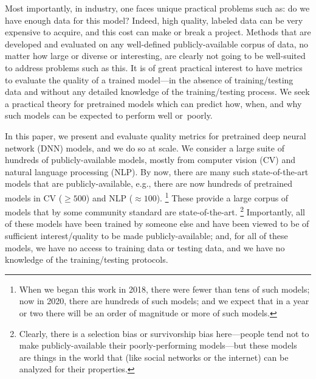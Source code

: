 Most importantly, in industry, one faces unique practical problems such as: do we have enough data for this model? 
Indeed, high quality, labeled data can be very expensive to acquire, and this cost can make or break a project.
Methods that are developed and evaluated on any well-defined publicly-available corpus of data, no matter how large or diverse or interesting, are clearly not going to be well-suited to address problems such as this.
It is of great practical interest to have metrics to evaluate the quality of a trained model---in the absence of training/testing data and without any detailed knowledge of the training/testing process.  
We seek a practical theory for pretrained models which can predict how, when, and why such models can be expected to perform well or~poorly.

In this paper, we present and evaluate quality metrics for pretrained deep neural network (DNN) models, and we do so at scale.
We consider a large suite of hundreds of publicly-available models, mostly from computer vision (CV) and natural language processing (NLP).
%
By now, there are many such state-of-the-art models that are publicly-available, e.g., 
there are now hundreds of pretrained models in CV ($\ge 500$) and NLP ($\approx 100$).%
\footnote{When we began this work in 2018, there were fewer than tens of such models; now in 2020, there are hundreds of such models; and we expect that in a year or two there will be an order of magnitude or more of such models.}
These provide a large corpus of models that by some community standard are state-of-the-art.%
\footnote{Clearly, there is a selection bias or survivorship bias here---people tend not to make publicly-available their poorly-performing models---but these models are things in the world that (like social networks or the internet) can be analyzed for their properties.}
Importantly, all of these models have been trained by someone else and have been viewed to be of sufficient interest/quality to be made publicly-available; and, for all of these models, we have no access to training data or testing data, and we have no knowledge of the training/testing protocols. 

